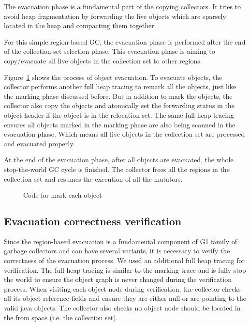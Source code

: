 The evacuation phase is a fundamental part of the copying collectors.
It tries to avoid heap fragmentation by forwarding the live objects which are sparsely located in the heap
and compacting them together.

For this simple region-based GC, the evacuation phase is performed after the end of the collection set selection phase.
This evacuation phase is aiming to copy/evacuate all live objects in the collection set to other
regions.

Figure~\ref{fig:traceevacuateobject} shows the process of object evacuation.
To evacuate objects, the collector performs another full heap tracing to remark all the objects,
just like the marking phase discussed before.
But in addition to mark the objects, the collector also copy the objects and atomically set the forwarding status in the object header
if the object is in the relocation set.
The same full heap tracing ensures all objects marked in the marking phase are also being scanned in the evacuation phase.
Which means all live objects in the collection set are processed and evacuated properly.

At the end of the evacuation phase, after all objects are evacuated, the whole stop-the-world GC cycle is finished.
The collector frees all the regions in the collection set and resumes the execution of all the mutators.

\begin{figure}
  \centering
  
  \caption{Code for mark each object}
  \label{fig:traceevacuateobject}
\end{figure}

\subsection{Evacuation correctness verification}

Since the region-based evacuation is a fundamental component of G1 family of garbage collectors
and can have several variants, it is necessary to verify the correctness of the evacuation process.
We used an additional full heap tracing for verification. The full heap tracing is
similar to the marking trace and is fully stop the world to ensure the object graph is never changed
during the verification process.
When visiting each object node during verification, the collector checks all its object reference fields
and ensure they are either null or are pointing to the valid java objects.
The collector also checks no object node should be located in the from space (i.e. the collection set).

